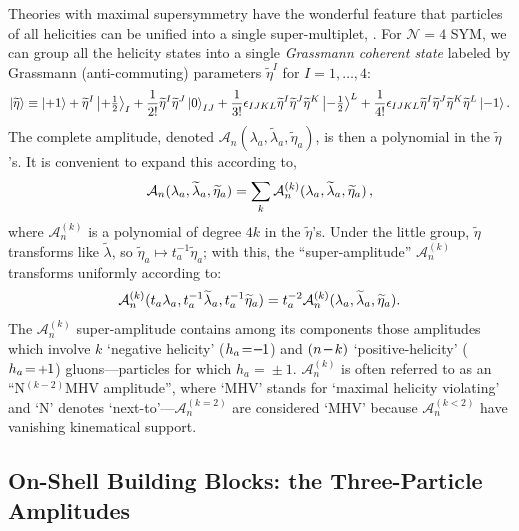 \documentclass[12pt,hyperref,compress]{JHEP3}
\newcommand{\eq}[1]{\begin{equation}#1\end{equation}}
\newcommand{\mi}{{\rm\rule[2.4pt]{6pt}{0.65pt}}}
\newcommand{\pl}{\hspace{0.5pt}\text{{\small+}}\hspace{-0.5pt}}
\begin{document}
Theories with maximal supersymmetry have the wonderful feature that particles of all helicities can be unified into a single super-multiplet, \cite{Nair:1988bq,Witten:2003nn,Bianchi:2008pu,Drummond:2008bq,ArkaniHamed:2008gz}. For $\mathcal{N}\!=\!4$ SYM, we can group all the helicity states into a single {\it Grassmann coherent state} labeled by Grassmann (anti-commuting) parameters $\widetilde{\eta}^I$ for $I= 1,\ldots, 4$:
\vspace{-.2cm}\eq{\left|\widetilde \eta \right> \equiv \left|+1 \right> + \widetilde \eta^I  \left|+\text{$\textstyle\frac{1}{2}$}\right>_I + \frac{1}{2!} \widetilde \eta^I \widetilde \eta^J \left|0 \right>_{IJ} + \frac{1}{3!} \epsilon_{IJKL} \widetilde \eta^I \widetilde \eta^J \widetilde \eta^K \left|-\text{$\textstyle\frac{1}{2}$} \right>^L + \frac{1}{4!} \epsilon_{IJKL} \widetilde \eta^I \widetilde \eta^J \widetilde \eta^K \widetilde \eta^L \left| -1 \right>. \nonumber\vspace{-.2cm}}
The complete amplitude, denoted $\mathcal{A}^{}_n(\lambda_a, \widetilde \lambda_a, \widetilde \eta_a)$, is then a polynomial in the $\widetilde{\eta}$'s. It is convenient to expand this according to,
\vspace{-.0cm}\eq{\mathcal{A}_n(\lambda_a, \widetilde \lambda_a, \widetilde \eta_a) = \sum_k \mathcal{A}^{(k)}_{n}(\lambda_a, \widetilde \lambda_a, \widetilde \eta_a)\,,\vspace{-.1cm}}
where $\mathcal{A}^{(k)}_{n}$ is a polynomial of degree $4k$ in the $\widetilde \eta$'s. Under the little group, $\widetilde{\eta}$ transforms like $\widetilde{\lambda}$, so $\widetilde{\eta}_a\!\mapsto\!t_a^{-1}\widetilde\eta_a$; with this, the ``super-amplitude'' $\mathcal{A}_n^{(k)}$ transforms uniformly according to:
\vspace{-.0cm}\eq{\mathcal{A}_n^{(k)}(t_a\lambda_a,t_a^{-1}\widetilde{\lambda}_a,t_a^{-1}\widetilde{\eta}_a) =t_a^{-2}\mathcal{A}_n^{(k)}(\lambda_a,\widetilde{\lambda}_a,\widetilde{\eta}_a).\vspace{-.0cm}}
The $\mathcal{A}^{(k)}_n$ super-amplitude contains among its components those amplitudes which involve $k$ `negative helicity' ($h_a\!=\!\mi1$) and $(n\,\mi\,k)$ `positive-helicity' ($h_a\!=\!\pl1$) gluons---particles for which $h_a\!=\!\pm1$. $\mathcal{A}^{(k)}_n$ is often referred to as an ``N$^{(k-2)}$MHV amplitude'', where `MHV' stands for `maximal helicity violating' and `N' denotes `next-to'---$\mathcal{A}_n^{(k=2)}$ are considered `MHV' because $\mathcal{A}_n^{(k<2)}$ have vanishing kinematical support. 
\subsection{On-Shell Building Blocks: the Three-Particle Amplitudes}
\end{document}
